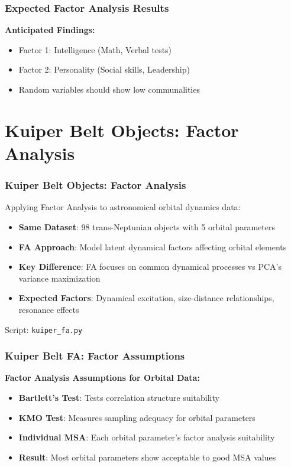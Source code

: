 \documentclass[aspectratio=169]{beamer}
\begin{document}
\begin{frame}
    \frametitle{Expected Factor Analysis Results}
    \textbf{Anticipated Findings:}
    \begin{itemize}
        \item Factor 1: Intelligence (Math, Verbal tests) \pause
        \item Factor 2: Personality (Social skills, Leadership) \pause
        \item Random variables should show low communalities \pause
    \end{itemize}
\end{frame}

\section{Kuiper Belt Objects: Factor Analysis}

\begin{frame}
    \frametitle{Kuiper Belt Objects: Factor Analysis}
    Applying Factor Analysis to astronomical orbital dynamics data:
    \begin{itemize}
        \item \textbf{Same Dataset}: 98 trans-Neptunian objects with 5 orbital parameters \pause
        \item \textbf{FA Approach}: Model latent dynamical factors affecting orbital elements \pause
        \item \textbf{Key Difference}: FA focuses on common dynamical processes vs PCA's variance maximization \pause
        \item \textbf{Expected Factors}: Dynamical excitation, size-distance relationships, resonance effects \pause
    \end{itemize}
    \vspace{6pt}
    Script: \texttt{kuiper\_fa.py}
\end{frame}

\begin{frame}
    \frametitle{Kuiper Belt FA: Factor Assumptions}
    \textbf{Factor Analysis Assumptions for Orbital Data:}
    \begin{itemize}
        \item \textbf{Bartlett's Test}: Tests correlation structure suitability \pause
        \item \textbf{KMO Test}: Measures sampling adequacy for orbital parameters \pause
        \item \textbf{Individual MSA}: Each orbital parameter's factor analysis suitability \pause
        \item \textbf{Result}: Most orbital parameters show acceptable to good MSA values \pause
    \end{itemize}
\end{frame}
\end{document}
